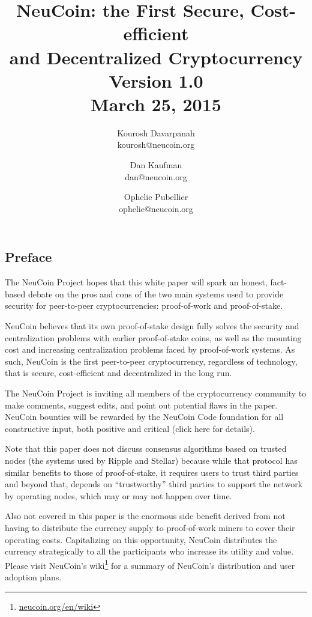 \documentclass[a4paper,11pt]{article}
\title{\vspace{-5mm}NeuCoin: the First Secure, Cost-efficient\\ and Decentralized Cryptocurrency\\
  \vspace{8mm}
  \large Version 1.0\\ March 25, 2015\vspace{3mm}}
\author{
  Kourosh Davarpanah\\
  kourosh@neucoin.org
  \and
  Dan Kaufman\\
  dan@neucoin.org
  \and
  Ophelie Pubellier\\
  ophelie@neucoin.org
\vspace{3mm}}
\date{}
\begin{document}
\maketitle 


\subsection*{Preface}

The NeuCoin Project hopes that this white paper will spark an honest, fact-based debate on the pros and cons of the two main systems used to provide security for peer-to-peer cryptocurrencies: proof-of-work and proof-of-stake. 
 
NeuCoin believes that its own proof-of-stake design fully solves the security and centralization problems with earlier proof-of-stake coins, as well as the mounting cost and increasing centralization problems faced by proof-of-work systems. As such, NeuCoin is the first peer-to-peer cryptocurrency, regardless of technology, that is secure, cost-efficient and decentralized in the long run.

The NeuCoin Project is inviting all members of the cryptocurrency community to make comments, suggest edits, and point out potential flaws in the paper. NeuCoin bounties will be rewarded by the NeuCoin Code foundation for all constructive input, both positive and critical (click here for details).

Note that this paper does not discuss consensus algorithms based on trusted nodes (the systems used by Ripple and Stellar) because while that protocol has similar benefits to those of proof-of-stake, it requires users to trust third parties and beyond that, depends on “trustworthy” third parties to support the network by operating nodes, which may or may not happen over time.

Also not covered in this paper is the enormous side benefit derived from not having to distribute the currency supply to proof-of-work miners to cover their operating costs. Capitalizing on this opportunity, NeuCoin distributes the currency strategically to all the participants who increase its utility and value. Please visit NeuCoin's wiki\footnote{\href{http://www.neucoin.org/en/wiki/}{neucoin.org/en/wiki}} for a summary of NeuCoin's distribution and user adoption plans.

\newpage
\end{document}
